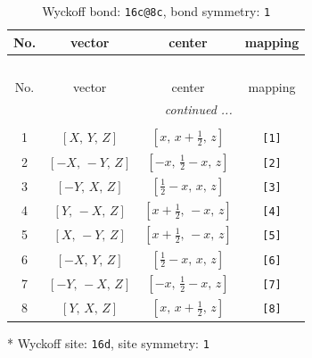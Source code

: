 \documentclass[fleqn,8pt]{jsarticle}
\begin{document}
\renewcommand{\arraystretch}{1.2}
\begin{longtable}{cccc}
\caption{Wyckoff bond: {\tt 16c@8c}, bond symmetry: {\tt 1}}
 \\
 \hline \hline
No. & vector & center & mapping \\ \hline \endfirsthead

\multicolumn{3}{l}{\tablename\ \thetable{}} \\
 \hline \hline
No. & vector & center & mapping \\ \hline \endhead

 \hline \hline
\multicolumn{3}{r}{\footnotesize\it continued ...} \\ \endfoot

 \hline \hline
\multicolumn{3}{r}{} \\ \endlastfoot

1 & $\left[ X,\, Y,\, Z \right]$ & $\left[ x,\, x + \frac{1}{2},\, z \right]$ & {\tt [1]} \\ \hline
2 & $\left[ - X,\, - Y,\, Z \right]$ & $\left[ - x,\, \frac{1}{2} - x,\, z \right]$ & {\tt [2]} \\ \hline
3 & $\left[ - Y,\, X,\, Z \right]$ & $\left[ \frac{1}{2} - x,\, x,\, z \right]$ & {\tt [3]} \\ \hline
4 & $\left[ Y,\, - X,\, Z \right]$ & $\left[ x + \frac{1}{2},\, - x,\, z \right]$ & {\tt [4]} \\ \hline
5 & $\left[ X,\, - Y,\, Z \right]$ & $\left[ x + \frac{1}{2},\, - x,\, z \right]$ & {\tt [5]} \\ \hline
6 & $\left[ - X,\, Y,\, Z \right]$ & $\left[ \frac{1}{2} - x,\, x,\, z \right]$ & {\tt [6]} \\ \hline
7 & $\left[ - Y,\, - X,\, Z \right]$ & $\left[ - x,\, \frac{1}{2} - x,\, z \right]$ & {\tt [7]} \\ \hline
8 & $\left[ Y,\, X,\, Z \right]$ & $\left[ x,\, x + \frac{1}{2},\, z \right]$ & {\tt [8]} \\
\end{longtable}
* Wyckoff site: {\tt 16d}, site symmetry: {\tt 1}
\renewcommand{\arraystretch}{1.2}
\end{document}
